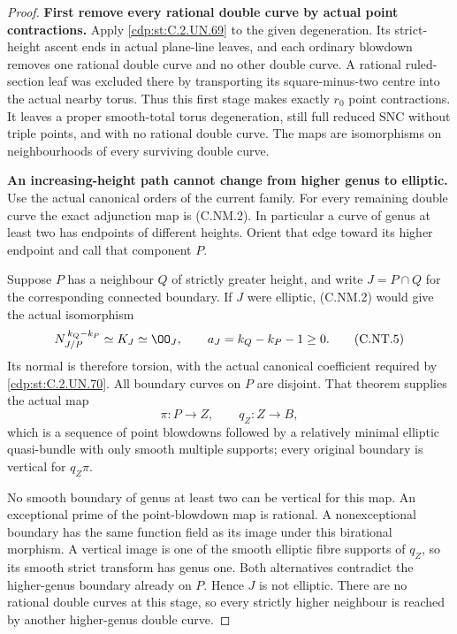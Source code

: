 \begin{proof}
\par\medskip\noindent\textbf{First remove every rational double curve by actual point contractions.}
Apply \ref{cdp:st:C.2.UN.69} to the given degeneration. Its strict-height
ascent ends in actual plane-line leaves, and each ordinary
blowdown removes one rational double curve and no other
double curve. A rational ruled-section leaf was excluded
there by transporting its square-minus-two centre into
the actual nearby torus. Thus this first stage makes
exactly $r_0$ point contractions. It leaves a proper
smooth-total torus degeneration, still full reduced
SNC without triple points, and with no rational double
curve. The maps are isomorphisms on neighbourhoods of
every surviving double curve.

\par\medskip\noindent\textbf{An increasing-height path cannot change from higher genus to elliptic.}
Use the actual canonical orders of the current family.
For every remaining double curve the exact adjunction
map is (C.NM.2). In particular a curve of genus at least
two has endpoints of different heights. Orient that
edge toward its higher endpoint and call that component
$P$.

Suppose $P$ has a neighbour $Q$ of strictly greater
height, and write $J=P\cap Q$ for the corresponding
connected boundary. If $J$ were elliptic, (C.NM.2)
would give the actual isomorphism
\[
      N_{J/P}^{\,k_Q-k_P}\simeq K_J\simeq\OO_J,
        \qquad a_J=k_Q-k_P-1\ge0 .
\tag{C.NT.5}\label{cdp:eq:C.NT.5}
\]
Its normal is therefore torsion, with the actual
canonical coefficient required by \ref{cdp:st:C.2.UN.70}. All boundary
curves on $P$ are disjoint. That theorem supplies
the actual map
\[
        \pi:P\longrightarrow Z,\qquad
        q_Z:Z\longrightarrow B,
\tag{C.NT.6}\label{cdp:eq:C.NT.6}
\]
which is a sequence of point blowdowns followed by a
relatively minimal elliptic quasi-bundle with only
smooth multiple supports; every original boundary
is vertical for $q_Z\pi$.

No smooth boundary of genus at least two can be
vertical for this map. An exceptional prime of the
point-blowdown map is rational. A nonexceptional
boundary has the same function field as its image
under this birational morphism. A vertical image is
one of the smooth elliptic fibre supports of $q_Z$,
so its smooth strict transform has genus one.
Both alternatives contradict the higher-genus
boundary already on $P$. Hence $J$ is not elliptic.
There are no rational double curves at this stage,
so every strictly higher neighbour is reached by
another higher-genus double curve.


\end{proof}
